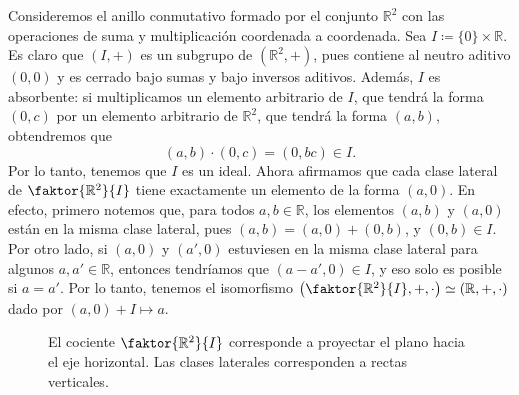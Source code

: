 \begin{example}
Consideremos el anillo conmutativo formado por el conjunto $\mathbb{R}^2$ con las operaciones de suma y multiplicación coordenada a coordenada. Sea $I \coloneqq \{ 0 \} \times \mathbb{R}$. Es claro que $(I, +)$ es un subgrupo de $(\mathbb{R}^2, +)$, pues contiene al neutro aditivo $(0, 0)$ y es cerrado bajo sumas y bajo inversos aditivos. Además, $I$ es absorbente: si multiplicamos un elemento arbitrario de $I$, que tendrá la forma $(0, c)$ por un elemento arbitrario de $\mathbb{R}^2$, que tendrá la forma $(a, b)$, obtendremos que
$$(a, b) \cdot (0, c) = (0, bc) \in I.$$
Por lo tanto, tenemos que $I$ es un ideal. Ahora afirmamos que cada clase lateral de $\faktor{\mathbb{R}^2}{I}$ tiene exactamente un elemento de la forma $(a, 0)$. En efecto, primero notemos que, para todos $a, b \in \mathbb{R}$, los elementos $(a, b)$ y $(a, 0)$ están en la misma clase lateral, pues $(a, b) = (a, 0) + (0, b)$, y $(0, b) \in I$. Por otro lado, si $(a, 0)$ y $(a', 0)$ estuviesen en la misma clase lateral para algunos $a, a' \in \mathbb{R}$, entonces tendríamos que $(a-a', 0) \in I$, y eso solo es posible si $a = a'$. Por lo tanto, tenemos el isomorfismo $\left(\faktor{\mathbb{R}^2}{I}, +, \cdot\right) \simeq (\mathbb{R}, +, \cdot)$ dado por $(a, 0) + I \mapsto a$.

\begin{figure}[ht!] \centering
{}
\caption{\label{dibujo_cociente} El cociente $\faktor{\mathbb{R}^2}{I}$ corresponde a proyectar el plano hacia el eje horizontal. Las clases laterales corresponden a rectas verticales.}
\end{figure}


\end{example}
